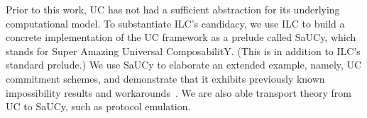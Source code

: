 Prior to this work, UC has not had a sufficient abstraction for its underlying
computational model. To substantiate ILC's candidacy, we use ILC to build a
concrete implementation of the UC framework as a prelude called SaUCy, which
stands for Super Amazing Universal ComposabilitY. (This is in addition to ILC's
standard prelude.) We use SaUCy to elaborate an extended example, namely, UC
commitment schemes, and demonstrate that it exhibits previously known
impossibility results and workarounds~\cite{canetti2001commitments}. We are also
able transport theory from UC to SaUCy, such as protocol emulation.
